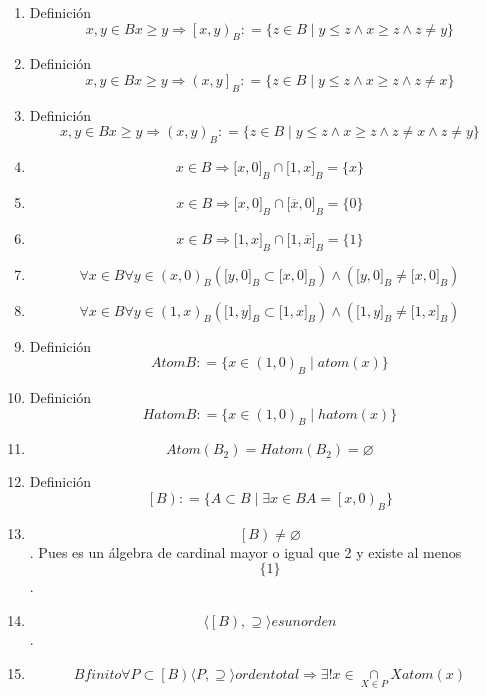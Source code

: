 \begin{enumerate}
\begin{enumerate}
\begin{enumerate}
    \item
      Definición\[x,{y \in B}{x \geq y}\Rightarrow\left\lbrack {x,y} \right)_{B}{: = {\{{{z \in B} \mid {{{y \leq {z \land x}} \geq {z \land z}} \neq y}}\}}}\]
    \item
      Definición\[x,{y \in B}{x \geq y}\Rightarrow\left( {x,y} \right\rbrack_{B}{: = {\{{{z \in B} \mid {{{y \leq {z \land x}} \geq {z \land z}} \neq x}}\}}}\]
    \item
      Definición\[x,{y \in B}{x \geq y}\Rightarrow\left( {x,y} \right)_{B}{: = {\{{{z \in B} \mid {{{{y \leq {z \land x}} \geq {z \land z}} \neq {x \land z}} \neq y}}\}}}\]
    \item
      \[{x \in B}\Rightarrow{{{\lbrack{x,0}\rbrack}_{B} \cap {\lbrack{1,x}\rbrack}_{B}} = {\{ x\}}}\]
    \item
      \[{x \in B}\Rightarrow{{{\lbrack{x,0}\rbrack}_{B} \cap {\lbrack{\overline{x},0}\rbrack}_{B}} = {\{ 0\}}}\]
    \item
      \[{x \in B}\Rightarrow{{{\lbrack{1,x}\rbrack}_{B} \cap {\lbrack{1,\overline{x}}\rbrack}_{B}} = {\{ 1\}}}\]
    \item
      \[\forall{x \in B}\forall{y \in \left( {x,0} \right)_{B}}{{({{\lbrack{y,0}\rbrack}_{B} \subset {\lbrack{x,0}\rbrack}_{B}})} \land {({{\lbrack{y,0}\rbrack}_{B} \neq {\lbrack{x,0}\rbrack}_{B}})}}\]
    \item
      \[\forall{x \in B}\forall{y \in \left( {1,x} \right)_{B}}{{({{\lbrack{1,y}\rbrack}_{B} \subset {\lbrack{1,x}\rbrack}_{B}})} \land {({{\lbrack{1,y}\rbrack}_{B} \neq {\lbrack{1,x}\rbrack}_{B}})}}\]
    \item
      Definición\[\mathit{Atom}B{: = {\{{{x \in (1,0)_{B}} \mid \mathit{atom}{(x)}}\}}}\]
    \item
      Definición\[\mathit{Hatom}B{: = {\{{{x \in (1,0)_{B}} \mid \mathit{hatom}{(x)}}\}}}\]
    \item
      \[\mathit{Atom}{{(B_{2})} = \mathit{Hatom}}{{(B_{2})} = \varnothing}\]
    \item
      Definición
      \[\left\lbrack B \right){: = {\{{{A \subset B} \mid \exists{x \in B}{A = \left\lbrack {x,0} \right)_{B}}}\}}}\]
    \item
      \[\left\lbrack B \right) \neq \varnothing\]. Pues es un álgebra de
      cardinal mayor o igual que 2 y existe al menos \[\{ 1\}\].
    \item
      \[{\langle{\left\lbrack B \right), \supseteq}\rangle}\mathit{es}\mathit{un}\mathit{orden}\].
    \item
      \[B\mathit{finito}\forall{P \subset \left\lbrack B \right)}{\langle{P, \supseteq}\rangle}\mathit{orden}\mathit{total}\Rightarrow\exists!{x \in \underset{X \in P}{\cap}}X\mathit{atom}(x)\]


\end{enumerate}
\end{enumerate}
\end{enumerate}
